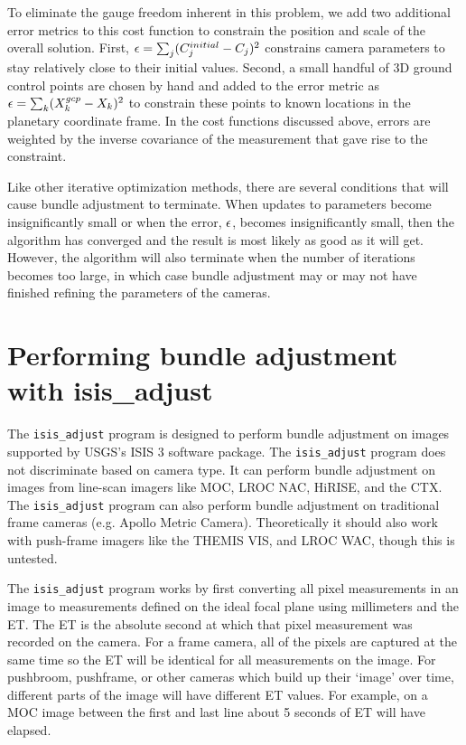 To eliminate the gauge freedom inherent in this problem, we add two
additional error metrics to this cost function to constrain the position
and scale of the overall solution. First, ${\bf \epsilon} =
\sum_j(C_j^{initial}-C_j)^2$ constrains camera parameters to stay
relatively close to their initial values.  Second, a small handful of
3D ground control points are chosen by hand and added to the
error metric as ${\bf \epsilon} = \sum_k(X_k^{gcp}-X_k)^2$ to
constrain these points to known locations in the planetary coordinate
frame.  In the cost functions discussed above, errors are weighted by
the inverse covariance of the measurement that gave rise to the
constraint.

Like other iterative optimization methods, there are several
conditions that will cause bundle adjustment to terminate.  When
updates to parameters become insignificantly small or when the error,
${\bf \epsilon}$, becomes insignificantly small, then the algorithm
has converged and the result is most likely as good as it will get.
However, the algorithm will also terminate when the number of
iterations becomes too large, in which case bundle adjustment may or
may not have finished refining the parameters of the cameras.

\section{Performing bundle adjustment with isis\_adjust}

The \texttt{isis\_adjust} program is designed to perform bundle
adjustment on images supported by USGS's \ac{ISIS} 3 software
package.  The \texttt{isis\_adjust} program does not discriminate
based on camera type.  It can perform bundle adjustment on images
from line-scan imagers like \ac{MOC}, \ac{LROC} NAC, \ac{HiRISE},
and the \ac{CTX}.  The \texttt{isis\_adjust} program can also perform
bundle adjustment on traditional frame cameras (e.g. Apollo Metric
Camera). Theoretically it should also work with push-frame
imagers like the \ac{THEMIS} VIS, and \ac{LROC} WAC, though this is
untested.

The \texttt{isis\_adjust} program works by first converting all
pixel measurements in an image to measurements defined on the ideal
focal plane using millimeters and the \ac{ET}. The \ac{ET} is the
absolute second at which that pixel measurement was recorded on the
camera.  For a frame camera, all of the pixels are captured at the
same time so the \ac{ET} will be identical for all measurements on
the image.  For pushbroom, pushframe, or other cameras which build
up their `image' over time, different parts of the image will have
different ET values.  For example, on a MOC image between the first
and last line about 5 seconds of \ac{ET} will have elapsed.


